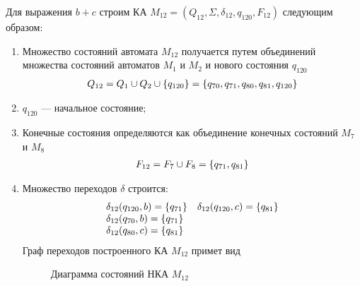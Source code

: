 \newpage
Для выражения \(b+c\) строим КА \(M_{12} = (Q_{12}, \Sigma, \delta_{12}, q_{120}, F_{12})\) следующим образом:
\begin{enumerate}
	\item Множество состояний автомата \(M_{12}\) получается путем объединений множества состояний автоматов \(M_1\) и \(M_2\) и нового состояния \(q_{120}\)
	      \begin{align*}
		      Q_{12} = Q_1 \cup Q_2 \cup \left\{q_{120}\right\} = \left\{q_{70}, q_{71}, q_{80}, q_{81}, q_{120}\right\}
	      \end{align*}
	\item \(q_{120}\) --- начальное состояние;
	\item Конечные состояния определяются как объединение конечных состояний \(M_7\) и \(M_8\)
	      \begin{align*}
		      F_{12} = F_{7} \cup F_{8} = \left\{q_{71}, q_{81}\right\}
	      \end{align*}
	\item Множество переходов \(\delta\) строится:
	      \begin{align*}
		      \begin{array}{ll}
			      \delta_{12}(q_{120}, b) = \left\{q_{71}\right\} & \delta_{12}(q_{120}, c) = \left\{q_{81}\right\} \\
			      \delta_{12}(q_{70}, b) = \left\{q_{71}\right\}                                           \\
			      \delta_{12}(q_{80}, c) = \left\{q_{81}\right\}
		      \end{array}
	      \end{align*}
	      Граф переходов построенного КА \(M_{12}\) примет вид
	      \begin{figure}[h!]
		      \centering
		      \caption{Диаграмма состояний НКА \(M_{12}\)}
	      \end{figure}
\end{enumerate}
